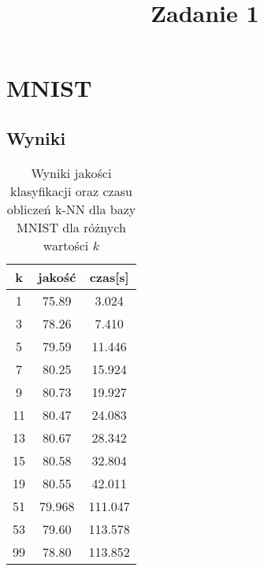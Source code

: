 \documentclass{classrepshort}
\author{
  \studentinfo{Hubert Marcinkowski}{214942} \and
  \studentinfo{Artur Wróblewski}{214985}
}
\title{Zadanie 1}
\begin{document}
\maketitle

\section{MNIST}

\subsection{Wyniki}
\begin{table}[h!]
  \centering
  \caption{Wyniki jakości klasyfikacji oraz czasu obliczeń k-NN dla bazy MNIST dla różnych wartości $k$}
  \label{tab:tab1}
  \begin{tabular}{|c|c|c|}
    \hline
	k & jakość & czas[s]\\
    \hline
	1 & 75.89 & 3.024\\
    \hline
	3 & 78.26 & 7.410\\
	\hline
	5 & 79.59 & 11.446\\
	\hline
	7 & 80.25 & 15.924\\
	\hline
	9 & 80.73 & 19.927\\
	\hline
	11 & 80.47 & 24.083\\
	\hline
	13 & 80.67 & 28.342\\
	\hline
	15 & 80.58 & 32.804\\
	\hline
	19 & 80.55 & 42.011\\
	\hline
	51 & 79.968 & 111.047\\
	\hline
	53 & 79.60 & 113.578\\
	\hline
	99 & 78.80 & 113.852\\
	\hline
  \end{tabular}
\end{table}
\end{document}
